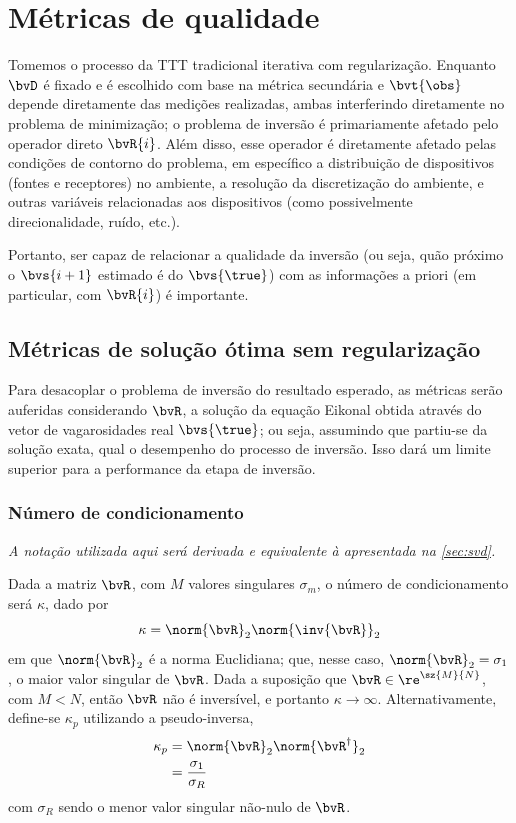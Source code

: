 \section{Métricas de qualidade}

Tomemos o processo da TTT tradicional iterativa com regularização. Enquanto $\bvD$ é fixado  e é escolhido com base na métrica secundária e $\bvt{\obs}$ depende diretamente das medições realizadas, ambas interferindo diretamente no problema de minimização; o problema de inversão é primariamente afetado pelo operador direto $\bvR{i}$. Além disso, esse operador é diretamente afetado pelas condições de contorno do problema, em específico a distribuição de dispositivos (fontes e receptores) no ambiente, a resolução da discretização do ambiente, e outras variáveis relacionadas aos dispositivos (como possivelmente direcionalidade, ruído, etc.).

Portanto, ser capaz de relacionar a qualidade da inversão (ou seja, quão próximo o $\bvs{i+1}$ estimado é do $\bvs{\true}$) com as informações a priori (em particular, com $\bvR{i}$) é importante.


\subsection{Métricas de solução ótima sem regularização}

Para desacoplar o problema de inversão do resultado esperado, as métricas serão auferidas considerando $\bvR$, a solução da equação Eikonal obtida através do vetor de vagarosidades real $\bvs{\true}$; ou seja, assumindo que partiu-se da solução exata, qual o desempenho do processo de inversão. Isso dará um limite superior para a performance da etapa de inversão.

\subsubsection*{Número de condicionamento}
\textsl{A notação utilizada aqui será derivada e equivalente à apresentada na \cref{sec:svd}.}

Dada a matriz $\bvR$, com $M$ valores singulares $\sigma_m$, o número de condicionamento será $\kappa$, dado por
\begin{equation}
	\kappa = \norm{\bvR}_2 \norm{\inv{\bvR}}_2
\end{equation}
em que $\norm{\bvR}_2$ é a norma Euclidiana; que, nesse caso, $\norm{\bvR}_2 = \sigma_1$, o maior valor singular de $\bvR$. Dada a suposição que $\bvR \in \re^{\sz{M}{N}}$, com $M < N$, então $\bvR$ não é inversível, e portanto $\kappa \to \infty$. Alternativamente, define-se $\kappa_p$ utilizando a pseudo-inversa,
\begin{equation}
	\begin{split}
		\kappa_p
		& = \norm{\bvR}_2 \norm{\bvR^\dagger}_2 \\
		& = \frac{\sigma_1}{\sigma_R}
	\end{split}
\end{equation}
com $\sigma_R$ sendo o menor valor singular não-nulo de $\bvR$. 

